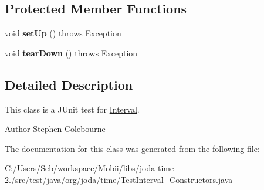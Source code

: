\subsection*{Protected Member Functions}
\begin{DoxyCompactItemize}
\item 
\hypertarget{classorg_1_1joda_1_1time_1_1_test_interval___constructors_abb2cafb0e4736f559332355e96a0e1ab}{void {\bfseries set\-Up} ()  throws Exception }\label{classorg_1_1joda_1_1time_1_1_test_interval___constructors_abb2cafb0e4736f559332355e96a0e1ab}

\item 
\hypertarget{classorg_1_1joda_1_1time_1_1_test_interval___constructors_a8618a2865979bcce96182925c740c46b}{void {\bfseries tear\-Down} ()  throws Exception }\label{classorg_1_1joda_1_1time_1_1_test_interval___constructors_a8618a2865979bcce96182925c740c46b}

\end{DoxyCompactItemize}


\subsection{Detailed Description}
This class is a J\-Unit test for \hyperlink{classorg_1_1joda_1_1time_1_1_interval}{Interval}.

\begin{DoxyAuthor}{Author}
Stephen Colebourne 
\end{DoxyAuthor}


The documentation for this class was generated from the following file\-:\begin{DoxyCompactItemize}
\item 
C\-:/\-Users/\-Seb/workspace/\-Mobii/libs/joda-\/time-\/2./src/test/java/org/joda/time/Test\-Interval\-\_\-\-Constructors.\-java\end{DoxyCompactItemize}
